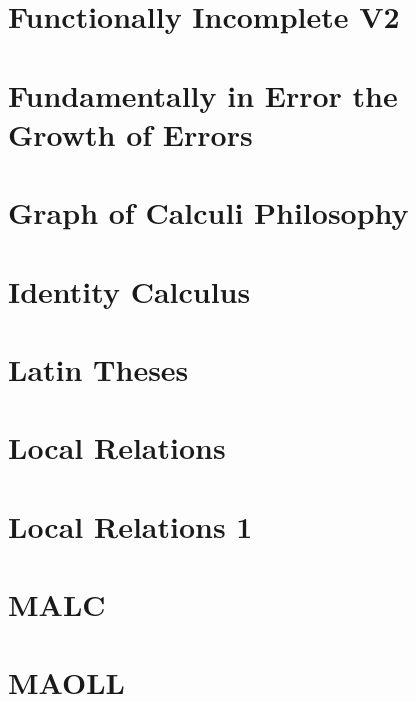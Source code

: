 \documentclass{report}
\begin{document}
\chapter{Functionally Incomplete V2}


\chapter{Fundamentally in Error the Growth of Errors}


\chapter{Graph of Calculi Philosophy}


\chapter{Identity Calculus}


\chapter{Latin Theses}


\chapter{Local Relations}


\chapter{Local Relations 1}


\chapter{MALC}


\chapter{MAOLL}

\end{document}
